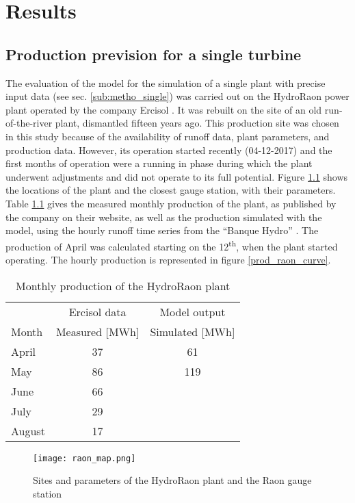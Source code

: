 \chapter{Results}
\label{chap:results}
\section{Production prevision for a single turbine}
\label{sec:res_single}

The evaluation of the model for the simulation of a single plant with precise input data (see sec. \ref{sub:metho_single}) was carried out on the HydroRaon power plant operated by the company Ercisol \cite{ercisol}. It was rebuilt on the site of an old run-of-the-river plant, dismantled fifteen years ago. This production site was chosen in this study because of the availability of runoff data, plant parameters, and production data. However, its operation started recently (04-12-2017) and the first months of operation were a running in phase during which the plant underwent adjustments and did not operate to its full potential. \newline
Figure \ref{raon_map} shows the locations of the plant and the closest gauge station, with their parameters. Table \ref{prod_raon} gives the measured monthly production of the plant, as published by the company on their website, as well as the production simulated with the model, using the hourly runoff time series from the ``Banque Hydro'' \cite{eaufrance}. The production of April was calculated starting on the 12\textsuperscript{th}, when the plant started operating. The hourly production is represented in figure \ref{prod_raon_curve}.

\begin{table}[H]
\footnotesize
 \centering
 \caption{Monthly production of the HydroRaon plant \cite{ercisol}}
 \label{prod_raon}
 \begin{tabular}{l|c|c|}
  &Ercisol data&Model output\\
  Month&Measured [MWh]&Simulated [MWh]\\
  \hline
  April&37&61\\
  May&86&119\\
  June&66&\\
  July&29&\\
  August&17&\\
 \end{tabular}
\end{table}

\begin{figure}[H]
\centering
\texttt{[image: raon\_map.png]}
\caption{Sites and parameters of the HydroRaon plant and the Raon gauge station}
\label{raon_map}
\end{figure}


